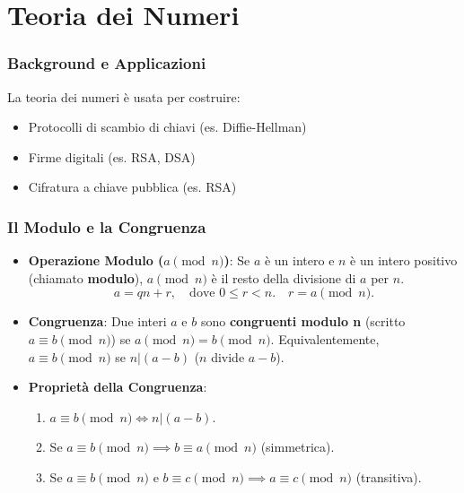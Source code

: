 \begin{itemize}
\begin{center}
    \end{center}
\end{itemize}

\part{Teoria dei Numeri}

\section{Background e Applicazioni}
La teoria dei numeri è usata per costruire:
\begin{itemize}
    \item Protocolli di scambio di chiavi (es. Diffie-Hellman)
    \item Firme digitali (es. RSA, DSA)
    \item Cifratura a chiave pubblica (es. RSA)
\end{itemize}

\section{Il Modulo e la Congruenza}
\begin{itemize}
    \item \textbf{Operazione Modulo ($a \pmod n$)}: Se $a$ è un intero e $n$ è un intero positivo (chiamato \textbf{modulo}), $a \pmod n$ è il resto della divisione di $a$ per $n$.
    \[ a = qn + r, \quad \text{dove } 0 \le r < n. \quad r = a \pmod n. \]
    \item \textbf{Congruenza}: Due interi $a$ e $b$ sono \textbf{congruenti modulo n} (scritto $a \equiv b \pmod n$) se $a \pmod n = b \pmod n$.
    Equivalentemente, $a \equiv b \pmod n$ se $n | (a-b)$ ($n$ divide $a-b$).
    \item \textbf{Proprietà della Congruenza}:
    \begin{enumerate}
        \item $a \equiv b \pmod n \iff n | (a-b)$.
        \item Se $a \equiv b \pmod n \implies b \equiv a \pmod n$ (simmetrica).
        \item Se $a \equiv b \pmod n$ e $b \equiv c \pmod n \implies a \equiv c \pmod n$ (transitiva).
    \end{enumerate}
\end{itemize}

